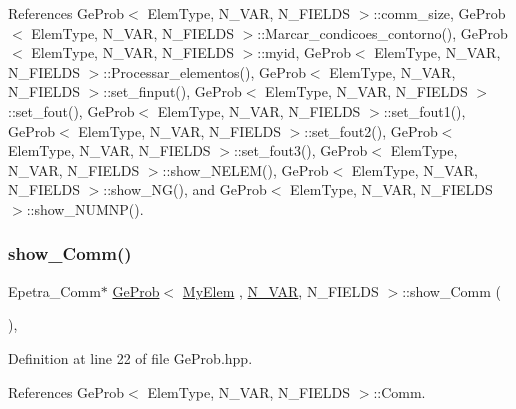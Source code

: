 References Ge\+Prob$<$ Elem\+Type, N\+\_\+\+V\+A\+R, N\+\_\+\+F\+I\+E\+L\+D\+S $>$\+::comm\+\_\+size, Ge\+Prob$<$ Elem\+Type, N\+\_\+\+V\+A\+R, N\+\_\+\+F\+I\+E\+L\+D\+S $>$\+::\+Marcar\+\_\+condicoes\+\_\+contorno(), Ge\+Prob$<$ Elem\+Type, N\+\_\+\+V\+A\+R, N\+\_\+\+F\+I\+E\+L\+D\+S $>$\+::myid, Ge\+Prob$<$ Elem\+Type, N\+\_\+\+V\+A\+R, N\+\_\+\+F\+I\+E\+L\+D\+S $>$\+::\+Processar\+\_\+elementos(), Ge\+Prob$<$ Elem\+Type, N\+\_\+\+V\+A\+R, N\+\_\+\+F\+I\+E\+L\+D\+S $>$\+::set\+\_\+finput(), Ge\+Prob$<$ Elem\+Type, N\+\_\+\+V\+A\+R, N\+\_\+\+F\+I\+E\+L\+D\+S $>$\+::set\+\_\+fout(), Ge\+Prob$<$ Elem\+Type, N\+\_\+\+V\+A\+R, N\+\_\+\+F\+I\+E\+L\+D\+S $>$\+::set\+\_\+fout1(), Ge\+Prob$<$ Elem\+Type, N\+\_\+\+V\+A\+R, N\+\_\+\+F\+I\+E\+L\+D\+S $>$\+::set\+\_\+fout2(), Ge\+Prob$<$ Elem\+Type, N\+\_\+\+V\+A\+R, N\+\_\+\+F\+I\+E\+L\+D\+S $>$\+::set\+\_\+fout3(), Ge\+Prob$<$ Elem\+Type, N\+\_\+\+V\+A\+R, N\+\_\+\+F\+I\+E\+L\+D\+S $>$\+::show\+\_\+\+N\+E\+L\+E\+M(), Ge\+Prob$<$ Elem\+Type, N\+\_\+\+V\+A\+R, N\+\_\+\+F\+I\+E\+L\+D\+S $>$\+::show\+\_\+\+N\+G(), and Ge\+Prob$<$ Elem\+Type, N\+\_\+\+V\+A\+R, N\+\_\+\+F\+I\+E\+L\+D\+S $>$\+::show\+\_\+\+N\+U\+M\+N\+P().

\mbox{\label{classGeProb_a810c17dc99110efbb57b8ad28adc5cb7}} 
\subsubsection{\texorpdfstring{show\+\_\+\+Comm()}{show\_Comm()}}
{\footnotesize\ttfamily Epetra\+\_\+\+Comm$\ast$ \hyperlink{classGeProb}{Ge\+Prob}$<$ \hyperlink{DG__Prob_8h_a83cd887ced9a6587428f267e50cd4787}{My\+Elem} , \hyperlink{classED__Prob_a4e7d2ff1a8e435e336fb00c527224b5a}{N\+\_\+\+V\+AR}, N\+\_\+\+F\+I\+E\+L\+DS $>$\+::show\+\_\+\+Comm (\begin{DoxyParamCaption}{ }\end{DoxyParamCaption})\hspace{0.3cm}{\ttfamily [inline]}, {\ttfamily [inherited]}}



Definition at line 22 of file Ge\+Prob.\+hpp.



References Ge\+Prob$<$ Elem\+Type, N\+\_\+\+V\+A\+R, N\+\_\+\+F\+I\+E\+L\+D\+S $>$\+::\+Comm.

\mbox{\label{classGeProb_aa9c2c6d251e061c3cf58806097c55f04}} 
